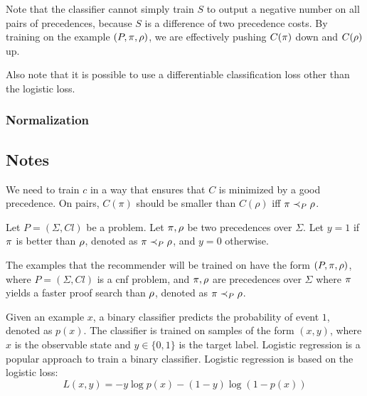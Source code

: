 Note that the classifier cannot simply train $S$ to output a negative number on all pairs of precedences,
because $S$ is a difference of two precedence costs.
By training on the example $(P, \pi, \rho)$,
we are effectively pushing $C(\pi)$ down and $C(\rho)$ up.

Also note that it is possible to use a differentiable classification loss other than the logistic loss.

\subsubsection{Normalization}


\iffalse

\subsection{Notes}

We need to train $c$ in a way that ensures that $C$ is minimized by a good precedence.
On pairs,
$C(\pi)$ should be smaller than $C(\rho)$ iff $\pi \prec_{P} \rho$.


Let $P = (\Sigma, \mathit{Cl})$ be a problem.
Let $\pi, \rho$ be two precedences over $\Sigma$.
Let $y = 1$ if $\pi$ is better than $\rho$,
denoted as $\pi \prec_{P} \rho$,
and $y = 0$ otherwise.

The examples that the recommender will be trained on have the form
$(P, \pi, \rho)$, where $P = (\Sigma, \mathit{Cl})$ is a \gls{cnf} problem, and $\pi, \rho$ are precedences over $\Sigma$
where $\pi$ yields a faster proof search than $\rho$,
denoted as $\pi \prec_{P} \rho$.

Given an example $x$,
a binary classifier predicts the probability of event $1$,
denoted as $p(x)$.
The classifier is trained on samples of the form $(x, y)$,
where $x$ is the observable state and $y \in \{0, 1\}$ is the target label.
Logistic regression is a popular approach to train a binary classifier.
Logistic regression is based on the logistic loss:
$$
L(x, y) = - y \log p(x) - (1-y) \log (1-p(x))
$$


